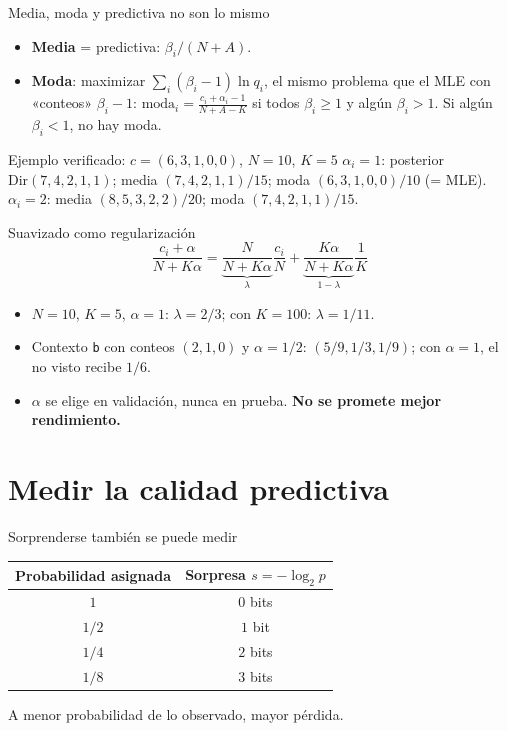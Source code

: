 \documentclass[aspectratio=169,10pt]{beamer}
\begin{document}
\begin{frame}{Media, moda y predictiva no son lo mismo}
\begin{itemize}\small
\item \textbf{Media} = predictiva: $\beta_i/(N+A)$.
\item \textbf{Moda}: maximizar $\sum_i(\beta_i-1)\ln q_i$, el mismo problema que el MLE con «conteos» $\beta_i-1$:
\(\text{moda}_i=\frac{c_i+\alpha_i-1}{N+A-K}\) si todos $\beta_i\ge1$ y algún $\beta_i>1$. Si algún $\beta_i<1$, no hay moda.
\end{itemize}
\begin{block}{Ejemplo verificado: $c=(6,3,1,0,0)$, $N=10$, $K=5$}
$\alpha_i=1$: posterior $\mathrm{Dir}(7,4,2,1,1)$; media $(7,4,2,1,1)/15$; moda $(6,3,1,0,0)/10$ (= MLE).\\
$\alpha_i=2$: media $(8,5,3,2,2)/20$; moda $(7,4,2,1,1)/15$.
\end{block}
\end{frame}

\begin{frame}{Suavizado como regularización}
\[\frac{c_i+\alpha}{N+K\alpha}=\underbrace{\frac{N}{N+K\alpha}}_{\lambda}\frac{c_i}{N}+\underbrace{\frac{K\alpha}{N+K\alpha}}_{1-\lambda}\frac1K\]
\begin{itemize}\small
\item $N=10$, $K=5$, $\alpha=1$: $\lambda=2/3$; con $K=100$: $\lambda=1/11$.
\item Contexto \texttt{b} con conteos $(2,1,0)$ y $\alpha=1/2$: $(5/9,1/3,1/9)$; con $\alpha=1$, el no visto recibe $1/6$.
\item $\alpha$ se elige en validación, nunca en prueba. \textbf{No se promete mejor rendimiento.}
\end{itemize}
\end{frame}

\section{Medir la calidad predictiva}
\begin{frame}{Sorprenderse también se puede medir}
\centering\begin{tabular}{cc}\toprule Probabilidad asignada & Sorpresa $s=-\log_2 p$\\\midrule $1$&$0$ bits\\$1/2$&$1$ bit\\$1/4$&$2$ bits\\$1/8$&$3$ bits\\\bottomrule\end{tabular}
\vspace{5mm}\large A menor probabilidad de lo observado, mayor pérdida.
\end{frame}
\end{document}
